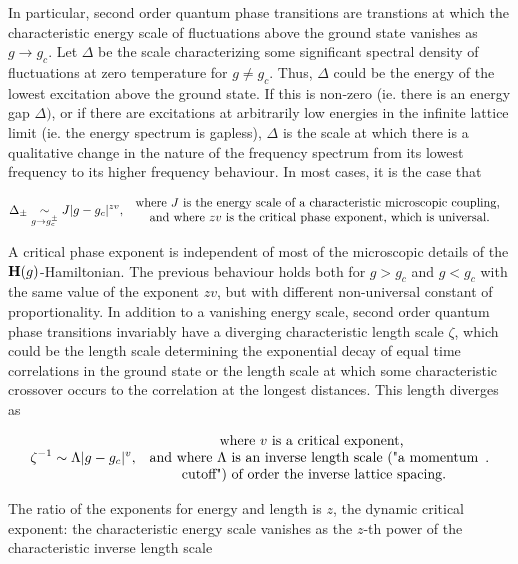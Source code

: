 \documentclass{homework}
\begin{document}
In particular, second order quantum phase transitions are transtions at which the characteristic energy scale of fluctuations above the ground state vanishes as $g \rightarrow g_c$. Let $\Delta$ be the scale characterizing some significant spectral density of fluctuations at zero temperature for $g \neq g_c$. Thus, $\Delta$ could be the energy of the lowest excitation above the ground state. If this is non-zero (ie. there is an energy gap $\Delta)$, or if there are excitations at arbitrarily low energies in the infinite lattice limit (ie. the energy spectrum is gapless), $\Delta$ is the scale at which there is a qualitative change in the nature of the frequency spectrum from its lowest frequency to its higher frequency behaviour. In most cases, it is the case that 

$$
    \Delta_{\pm} \underset{g \rightarrow g_c^{\pm}}{\sim} J |g-g_c|^{zv},  \begin{array}{c}
         \textnormal{ where $J$ is the energy scale of a characteristic microscopic coupling, }  \\
         \textnormal{ and where $zv$ is the critical phase exponent, which is universal.} 
    \end{array}
$$

A critical phase exponent is independent of most of the microscopic details of the ${\bf H}(g)$-Hamiltonian. The previous behaviour holds both for $g > g_c$ and $g < g_c$ with the same value of the exponent $zv$, but with different non-universal constant of proportionality. In addition to a vanishing energy scale, second order quantum phase transitions invariably have a diverging characteristic length scale $\zeta$, which could be the length scale determining the exponential decay of equal time correlations in the ground state or the length scale at which some characteristic crossover occurs to the correlation at the longest distances. This length diverges as 

$$
\zeta^{-1} \sim \Lambda |g-g_c|^{v}, \begin{array}{c}
         \textnormal{ where $v$ is a critical exponent, }  \\
         \textnormal{ and where $\Lambda$ is an inverse length scale ("a momentum}\\\textnormal{ cutoff") of order the inverse lattice spacing.} 
    \end{array}.
$$

The ratio of the exponents for energy and length is $z$, the dynamic critical exponent: the characteristic energy scale vanishes as the $z$-th power of the characteristic inverse length scale 
\end{document}
